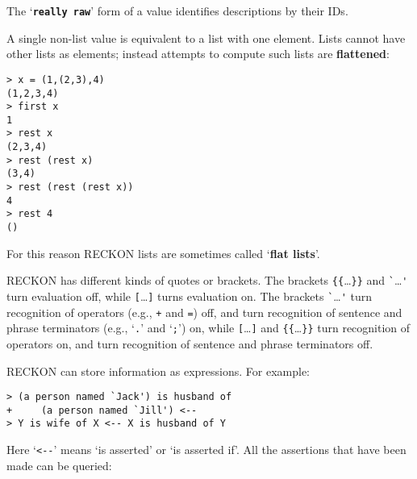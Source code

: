 \documentclass[12pt]{article}
\newcommand{\TT}[1]{{\tt \bfseries #1}}
\newcommand{\key}[1]{{\rm \bfseries #1}}
\newenvironment{indpar}[1][0.3in]%
	{\begin{list}{}%
		     {\setlength{\itemsep}{0in}%
		      \setlength{\topsep}{0in}%
		      \setlength{\parsep}{1ex}%
		      \setlength{\labelwidth}{#1}%
		      \setlength{\leftmargin}{#1}%
		      \addtolength{\leftmargin}{\labelsep}}%
	 \item}%
	{\end{list}}
\begin{document}
The `\TT{really raw}' form of a value identifies descriptions by their IDs.

A single non-list value is equivalent to a list with one element.
Lists cannot have other lists as elements; instead attempts to
compute such lists are \key{flattened}:

\begin{indpar}
\verb|> x = (1,(2,3),4)| \\
\verb|(1,2,3,4)| \\
\verb|> first x| \\
\verb|1| \\
\verb|> rest x| \\
\verb|(2,3,4)| \\
\verb|> rest (rest x)| \\
\verb|(3,4)| \\
\verb|> rest (rest (rest x))| \\
\verb|4| \\
\verb|> rest 4| \\
\verb|()|
\end{indpar}

For this reason RECKON lists are sometimes called `\key{flat lists}'.

RECKON has different kinds of quotes or brackets.  The brackets
\verb|{{|\ldots\verb|}}| and \verb|`|\ldots\verb|'|
turn
evaluation off, while \verb|[|\ldots\verb|]| turns evaluation on.
The brackets \verb|`|\ldots\verb|'| turn
recognition of operators (e.g., \verb|+| and \verb|=|) off, and turn
recognition of sentence and phrase terminators
(e.g., `\verb|.|' and `\verb|;|') on,
while \verb|[|\ldots\verb|]| and \verb|{{|\ldots\verb|}}|
turn recognition of operators on, and turn recognition of
sentence and phrase terminators off.

RECKON can store information as expressions.  For example:

\begin{indpar}
\verb|> (a person named `Jack') is husband of| \\
\verb|+     (a person named `Jill') <--| \\
\verb|> Y is wife of X <-- X is husband of Y|
\end{indpar}

Here `\verb|<--|' means `is asserted' or `is asserted if'.
All the assertions that have been made can be queried:
\end{document}
